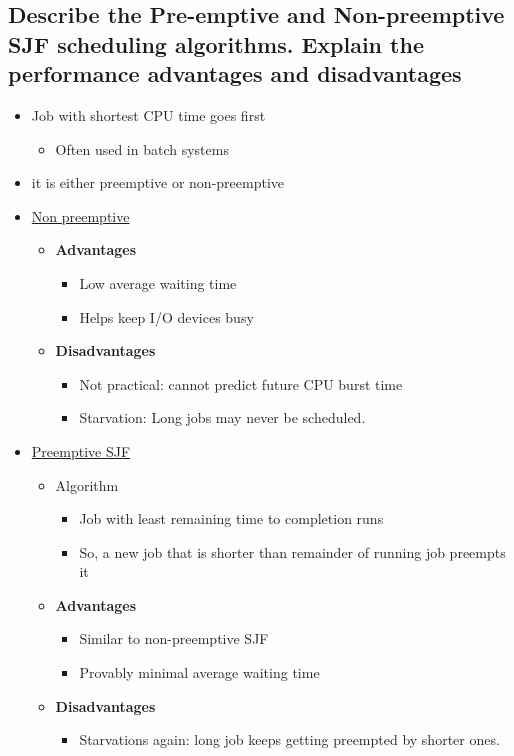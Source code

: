 \documentclass[a4paper]{article}
\begin{document}
\subsection{Describe the Pre-emptive and Non-preemptive SJF scheduling algorithms. Explain the performance advantages and disadvantages} %
\label{sub:Describe the Pre-emptive and Non-preemptive SJF scheduling algorithms. Explain the performance advantages and disadvantages}
\begin{itemize}
  \item Job with shortest CPU time goes first
    \begin{itemize}
      \item Often used in batch systems
    \end{itemize}
  \item it is either preemptive or non-preemptive
  \item \underline{Non preemptive}
    \begin{itemize}
      \item {\bf Advantages}
        \begin{itemize}
          \item Low average waiting time
          \item Helps keep I/O devices busy
        \end{itemize}
      \item {\bf Disadvantages}
        \begin{itemize}
          \item Not practical: cannot predict future CPU burst time
          \item Starvation: Long jobs may never be scheduled.
        \end{itemize}
    \end{itemize}
  \item \underline{ Preemptive SJF}
    \begin{itemize}
      \item Algorithm
        \begin{itemize}
          \item Job with least remaining time to completion runs
          \item So, a new job that is shorter than remainder of running job preempts it
        \end{itemize}
      \item {\bf Advantages}
        \begin{itemize}
          \item Similar to non-preemptive SJF
          \item Provably minimal average waiting time
        \end{itemize}
      \item {\bf Disadvantages}
        \begin{itemize}
          \item Starvations again: long job keeps getting preempted by shorter ones.
        \end{itemize}
    \end{itemize}
\end{itemize}
\end{document}
